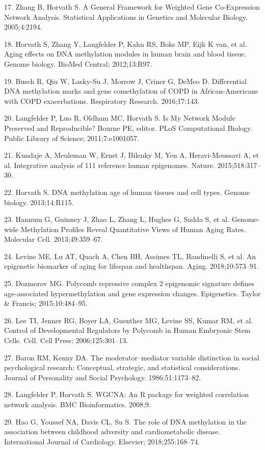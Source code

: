\documentclass[]{bmcart}
\theoremstyle{definition}
\theoremstyle{definition}
\theoremstyle{definition}
\theoremstyle{remark}
\begin{document}
17. Zhang B, Horvath S. A General Framework for Weighted Gene
Co-Expression Network Analysis. Statistical Applications in Genetics and
Molecular Biology. 2005;4:2194.

18. Horvath S, Zhang Y, Langfelder P, Kahn RS, Boks MP, Eijk K van, et
al. Aging effects on DNA methylation modules in human brain and blood
tissue. Genome biology. BioMed Central; 2012;13:R97.

19. Busch R, Qiu W, Lasky-Su J, Morrow J, Criner G, DeMeo D.
Differential DNA methylation marks and gene comethylation of COPD in
African-Americans with COPD exacerbations. Respiratory Research.
2016;17:143.

20. Langfelder P, Luo R, Oldham MC, Horvath S. Is My Network Module
Preserved and Reproducible? Bourne PE, editor. PLoS Computational
Biology. Public Library of Science; 2011;7:e1001057.

21. Kundaje A, Meuleman W, Ernst J, Bilenky M, Yen A, Heravi-Moussavi A,
et al. Integrative analysis of 111 reference human epigenomes. Nature.
2015;518:317--30.

22. Horvath S. DNA methylation age of human tissues and cell types.
Genome biology. 2013;14:R115.

23. Hannum G, Guinney J, Zhao L, Zhang L, Hughes G, Sadda S, et al.
Genome-wide Methylation Profiles Reveal Quantitative Views of Human
Aging Rates. Molecular Cell. 2013;49:359--67.

24. Levine ME, Lu AT, Quach A, Chen BH, Assimes TL, Bandinelli S, et al.
An epigenetic biomarker of aging for lifespan and healthspan. Aging.
2018;10:573--91.

25. Dozmorov MG. Polycomb repressive complex 2 epigenomic signature
defines age-associated hypermethylation and gene expression changes.
Epigenetics. Taylor \& Francis; 2015;10:484--95.

26. Lee TI, Jenner RG, Boyer LA, Guenther MG, Levine SS, Kumar RM, et
al. Control of Developmental Regulators by Polycomb in Human Embryonic
Stem Cells. Cell. Cell Press; 2006;125:301--13.

27. Baron RM, Kenny DA. The moderator--mediator variable distinction in
social psychological research: Conceptual, strategic, and statistical
considerations. Journal of Personality and Social Psychology.
1986;51:1173--82.

28. Langfelder P, Horvath S. WGCNA: An R package for weighted
correlation network analysis. BMC Bioinformatics. 2008;9.

29. Hao G, Youssef NA, Davis CL, Su S. The role of DNA methylation in
the association between childhood adversity and cardiometabolic disease.
International Journal of Cardiology. Elsevier; 2018;255:168--74.
\end{document}
